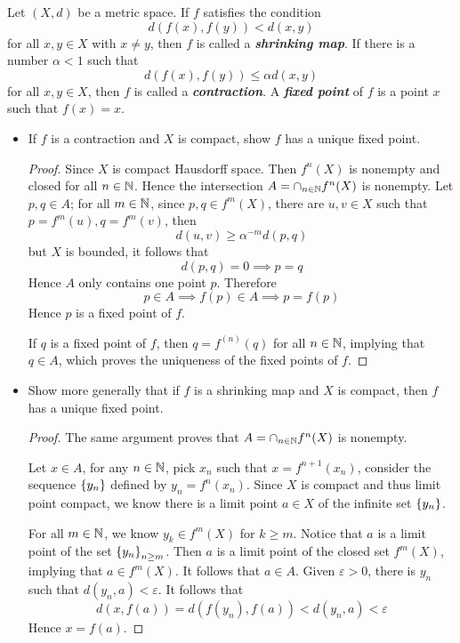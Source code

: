 \documentclass[12pt,a4paper]{article}
\begin{document}
    \begin{ex}
        Let $(X,d)$ be a metric space. If $f$ satisfies the condition
        $$
        d(f(x), f(y))<d(x,y)
        $$
        for all $x,y\in X$ with $x\neq y$, then $f$ is called a \textbf{\textit{shrinking map}}. If there is a number $\alpha<1$ such that
        $$
        d(f(x),f(y))\leq \alpha d(x,y)
        $$
        for all $x,y\in X$, then $f$ is called a \textbf{\textit{contraction}}. A \textbf{\textit{fixed point}} of $f$ is a point $x$ such that $f(x)=x$.
        \begin{itemize}
            \item If $f$ is a contraction and $X$ is compact, show $f$ has a unique fixed point.
            \begin{proof}
                Since $X$ is compact Hausdorff space. Then $f^{n}(X)$ is nonempty and closed for all $n\in \mathbb{N}$. Hence the intersection $A=\cap_{n\in\mathbb{N}}f^{n}(X)$ is nonempty. Let $p,q\in A$; for all $m\in\mathbb{N}$, since $p,q\in f^{m}(X)$, there are $u,v\in X$ such that $p=f^m(u),q=f^m(v)$, then
                $$
                d(u,v)\geq \alpha^{-m}d(p,q)
                $$
                but $X$ is bounded, it follows that 
                $$
                d(p,q)=0\implies p=q
                $$
                Hence $A$ only contains one point $p$. Therefore
                $$
                p\in A\implies f(p)\in A\implies p=f(p)
                $$
                Hence $p$ is a fixed point of $f$.
                
                If $q$ is a fixed point of $f$, then $q=f^{(n)}(q)$ for all $n\in\mathbb{N}$, implying that $q\in A$, which proves the uniqueness of the fixed points of $f$.
            \end{proof}
            \item Show more generally that if $f$ is a shrinking map and $X$ is compact, then $f$ has a unique fixed point.
            \begin{proof}
                The same argument proves that $A=\cap_{n\in\mathbb{N}}f^{n}(X)$ is nonempty.
                
                Let $x\in A$, for any $n\in\mathbb{N}$, pick $x_n$ such that $x=f^{n+1}(x_n)$, consider the sequence $\left\{y_n\right\}$ defined by $y_n=f^n(x_n)$. Since $X$ is compact and thus limit point compact, we know there is a limit point $a\in X$ of the infinite set $\left\{y_n\right\}$.

                For all $m\in\mathbb{N}$, we know $y_k\in f^m(X)$ for $k\geq m$. Notice that $a$ is a limit point of the set $\left\{y_n\right\}_{n\geq m}$. Then $a$ is a limit point of the closed set $f^{m}(X)$, implying that $a\in f^{m}(X)$. It follows that $a\in A$. Given $\varepsilon>0$, there is $y_n$ such that $d(y_n,a)<\varepsilon$. It follows that
                $$
                d(x,f(a))=d(f(y_n),f(a))<d(y_n,a)<\varepsilon
                $$
                Hence $x=f(a)$.
                

\end{proof}
\end{itemize}
\end{ex}
\end{document}
